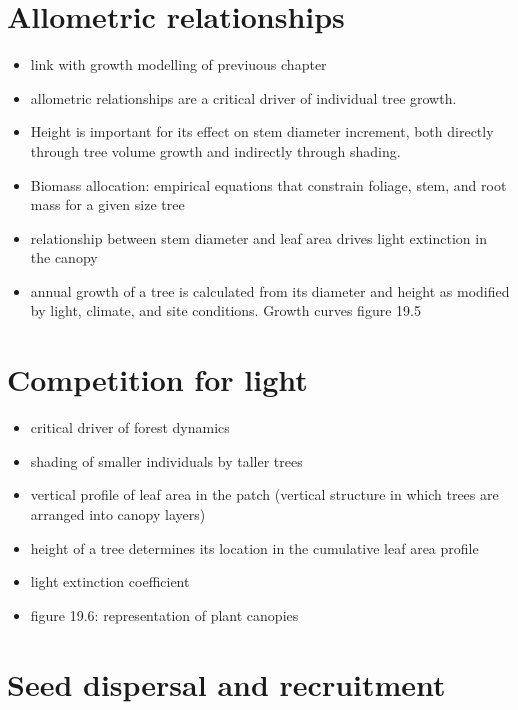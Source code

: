 \documentclass[
  oneside]{book}
\providecommand{\tightlist}{%
  \setlength{\itemsep}{0pt}\setlength{\parskip}{0pt}}
\begin{document}
\hypertarget{allometric-relationships}{%
\section{Allometric relationships}\label{allometric-relationships}}

\begin{itemize}
\tightlist
\item
  link with growth modelling of previuous chapter
\item
  allometric relationships are a critical driver of individual tree growth.
\item
  Height is important for its effect on stem diameter increment, both directly through tree volume growth and indirectly through shading.
\item
  Biomass allocation: empirical equations that constrain foliage, stem, and root mass for a given size tree
\item
  relationship between stem diameter and leaf area drives light extinction in the canopy
\item
  annual growth of a tree is calculated from its diameter and height as modified by light, climate, and site conditions. Growth curves figure 19.5
\end{itemize}

\hypertarget{competition-for-light}{%
\section{Competition for light}\label{competition-for-light}}

\begin{itemize}
\tightlist
\item
  critical driver of forest dynamics
\item
  shading of smaller individuals by taller trees
\item
  vertical profile of leaf area in the patch (vertical structure in which trees are arranged into canopy layers)
\item
  height of a tree determines its location in the cumulative leaf area profile
\item
  light extinction coefficient
\item
  figure 19.6: representation of plant canopies
\end{itemize}

\hypertarget{seed-dispersal-and-recruitment}{%
\section{Seed dispersal and recruitment}\label{seed-dispersal-and-recruitment}}
\end{document}

